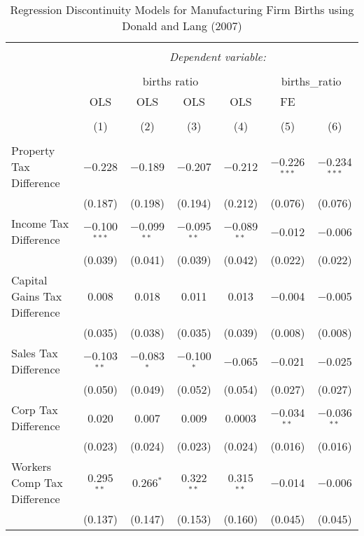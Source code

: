 
\begin{table}[!htbp] \centering 
  \caption{Regression Discontinuity Models for  Manufacturing Firm Births using Donald and Lang (2007)} 
  \label{} 
\begin{tabular}{@{\extracolsep{5pt}}lcccccc} 
\\[-1.8ex]\hline 
\hline \\[-1.8ex] 
 & \multicolumn{6}{c}{\textit{Dependent variable:}} \\ 
\cline{2-7} 
\\[-1.8ex] & \multicolumn{4}{c}{births ratio} & \multicolumn{2}{c}{births\_ratio} \\ 
 & OLS & OLS & OLS & OLS & FE &  \\ 
\\[-1.8ex] & (1) & (2) & (3) & (4) & (5) & (6)\\ 
\hline \\[-1.8ex] 
 Property Tax Difference & $-$0.228 & $-$0.189 & $-$0.207 & $-$0.212 & $-$0.226$^{***}$ & $-$0.234$^{***}$ \\ 
  & (0.187) & (0.198) & (0.194) & (0.212) & (0.076) & (0.076) \\ 
  Income Tax Difference & $-$0.100$^{***}$ & $-$0.099$^{**}$ & $-$0.095$^{**}$ & $-$0.089$^{**}$ & $-$0.012 & $-$0.006 \\ 
  & (0.039) & (0.041) & (0.039) & (0.042) & (0.022) & (0.022) \\ 
  Capital Gains Tax Difference & 0.008 & 0.018 & 0.011 & 0.013 & $-$0.004 & $-$0.005 \\ 
  & (0.035) & (0.038) & (0.035) & (0.039) & (0.008) & (0.008) \\ 
  Sales Tax Difference & $-$0.103$^{**}$ & $-$0.083$^{*}$ & $-$0.100$^{*}$ & $-$0.065 & $-$0.021 & $-$0.025 \\ 
  & (0.050) & (0.049) & (0.052) & (0.054) & (0.027) & (0.027) \\ 
  Corp Tax Difference & 0.020 & 0.007 & 0.009 & 0.0003 & $-$0.034$^{**}$ & $-$0.036$^{**}$ \\ 
  & (0.023) & (0.024) & (0.023) & (0.024) & (0.016) & (0.016) \\ 
  Workers Comp Tax Difference & 0.295$^{**}$ & 0.266$^{*}$ & 0.322$^{**}$ & 0.315$^{**}$ & $-$0.014 & $-$0.006 \\ 
  & (0.137) & (0.147) & (0.153) & (0.160) & (0.045) & (0.045) \\ 

\end{tabular}
\end{table}
